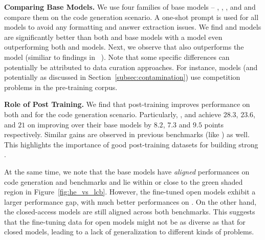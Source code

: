 \vspace{1pt}
\noindent \textbf{Comparing Base Models.}
We use four families of base models -- \llamabase{}, \deepseek{}, \cllama{}, and \starcodertwo{} and compare them on the code generation scenario.
A one-shot prompt is used for all models to avoid any formatting and answer extraction issues.
We find \llamabase{} and \deepseekcode{} models are significantly better than both \cllama{} and \starcodertwo{} base models with 
a  model even outperforming both  and  models.
Next, we observe that  also outperforms the  model (similiar to findings in ~\cite{starcoder2}).
Note that some \livecodebench{} specific differences can potentially be attributed to data curation approaches.
For instance, \starcodertwo{} models (and potentially \deepseeks{} as discussed in Section~\ref{subsec:contamination}) use competition problems in the pre-training corpus.%

\vspace{1pt}
\noindent \textbf{Role of Post Training.}
We find that post-training improves performance on both \humanevalplus{} and \livecodebench{} for the code generation scenario.
Particularly, ,  and \phind{} achieve $28.3$, $23.6$, and $21$  on \lcb{} 
improving over their base models by $8.2$, $7.3$ and $9.5$ points respectively.
Similar gains are observed in previous benchmarks (like \humanevalplus{}) as well.
This highlights the importance of good post-training datasets  for building strong \llms{}. 

At the same time, we note that the base models have \textit{aligned} performances on \lcb{} code generation and \humanevalplus{} benchmarks and lie within or close to the green shaded region in Figure~\ref{fig:he_vs_lcb}.
However, the fine-tuned open models exhibit a larger performance gap, with much better performances on \humanevalplus{}.
On the other hand, the closed-access models are still aligned across both benchmarks.
This suggests that the fine-tuning data for open models might not be as diverse as that for closed models, leading to a lack of generalization to different kinds of problems.


